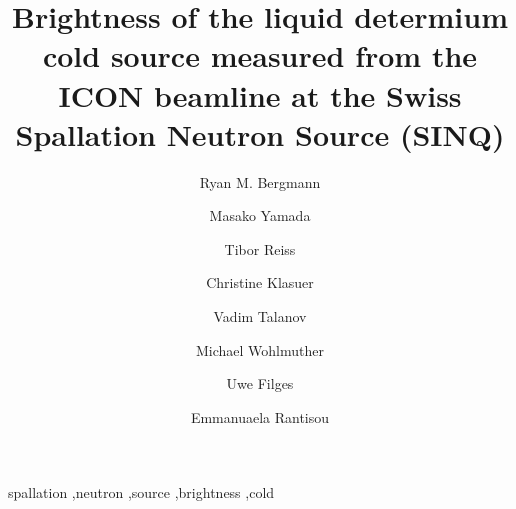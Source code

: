 \documentclass[preprint,12pt]{elsarticle}
\begin{document}
\begin{frontmatter}



\title{Brightness of the liquid determium cold source measured from the ICON beamline at the Swiss Spallation Neutron Source (SINQ)}


\author{Ryan M. Bergmann}

\author{Masako Yamada}

\author{Tibor Reiss}

\author{Christine Klasuer}

\author{Vadim Talanov}

\author{Michael Wohlmuther}

\author{Uwe Filges}

\author{Emmanuaela Rantisou}


\address{Paul Scherrer Institut, Villigen, Switzerland}

\begin{abstract}


\end{abstract}

\begin{keyword}
spallation \sep neutron \sep source \sep brightness \sep cold


\end{keyword}


\end{frontmatter}

\linenumbers
\end{document}
